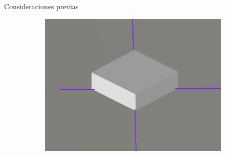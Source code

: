 \documentclass[spanish,a4paper]{beamer}%
\begin{document}
\begin{frame}{Consideraciones previas}
\begin{adjustwidth}{-2em}{-2em}
\begin{figure}
{\begin{subfigure}[c]{.4\textwidth}
						\includegraphics[width=\textwidth]{Conduccion/modelado3D_centro_cerca}
					\label{fig:modelado3D_centro_cerca}
				\end{subfigure}
			}
			\label{fig:CuestionesPrevias}
		\end{figure}
		\end{adjustwidth}
	\end{frame}
\end{document}
